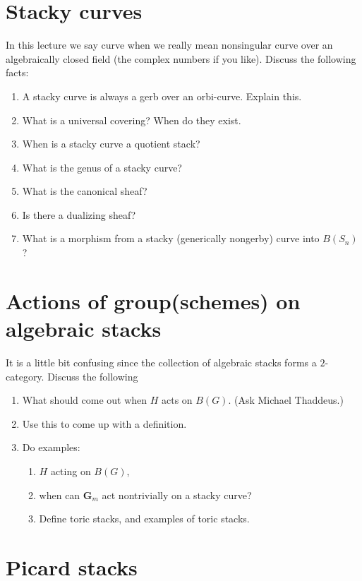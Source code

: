 \documentclass{amsart}
\theoremstyle{plain}
\theoremstyle{definition}
\theoremstyle{remark}
\numberwithin{equation}{subsection}
\begin{document}
\section{Stacky curves}
\label{section-stacky-curves}

\noindent
In this lecture we say curve when we really mean nonsingular curve
over an algebraically closed field (the complex numbers if you like).
Discuss the following facts:
\begin{enumerate}
\item A stacky curve is always a gerb over an orbi-curve. Explain this.
\item What is a universal covering? When do they exist.
\item When is a stacky curve a quotient stack?
\item What is the genus of a stacky curve?
\item What is the canonical sheaf?
\item Is there a dualizing sheaf?
\item What is a morphism from a stacky (generically nongerby) curve
into $B(S_n)$?
\end{enumerate}

\section{Actions of group(schemes) on algebraic stacks}
\label{section-actions}

\noindent
It is a little bit confusing since the collection of algebraic stacks
forms a $2$-category. Discuss the following
\begin{enumerate}
\item What should come out when $H$ acts on $B(G)$. (Ask Michael Thaddeus.)
\item Use this to come up with a definition.
\item Do examples:
\begin{enumerate}
\item $H$ acting on $B(G)$,
\item when can $\mathbf{G}_m$ act nontrivially on a stacky curve?
\item Define toric stacks, and examples of toric stacks.
\end{enumerate}
\end{enumerate}


\section{Picard stacks}
\label{section-picard}
\end{document}
